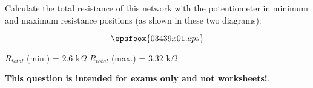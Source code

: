 

Calculate the total resistance of this network with the potentiometer in minimum and maximum resistance positions (as shown in these two diagrams):

$$\epsfbox{03439x01.eps}$$







$R_{total}$ (min.) = 2.6 k$\Omega$ \hskip 100pt $R_{total}$ (max.) = 3.32 k$\Omega$







{\bf This question is intended for exams only and not worksheets!}.



